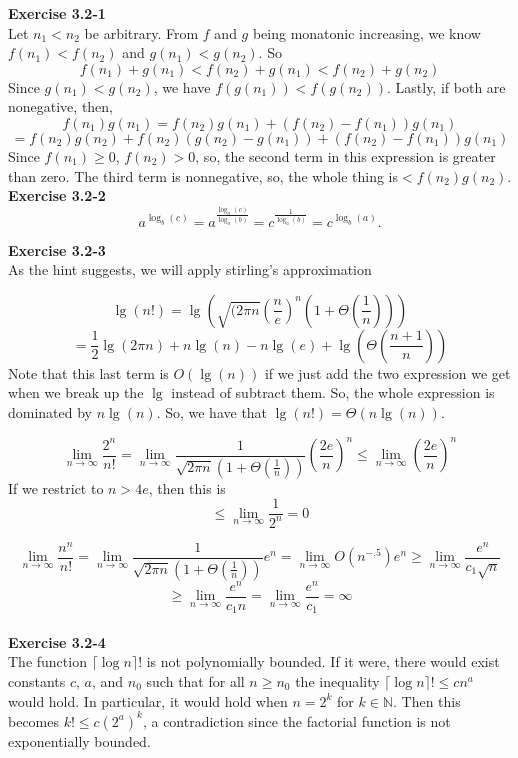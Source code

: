 \documentclass{article}
\begin{document}
\noindent\textbf{Exercise 3.2-1}\\

Let $n_1 < n_2$ be arbitrary. From $f$ and $g$ being monatonic increasing, we know $f(n_1)< f(n_2)$ and $g(n_1) < g(n_2)$. So
\[
f(n_1)+g(n_1) < f(n_2) + g(n_1) < f(n_2)+g(n_2)
\]
Since $g(n_1)<g(n_2)$, we have $f(g(n_1))<f(g(n_2))$. Lastly, if both are nonegative, then, 
\[
f(n_1)g(n_1) = f(n_2)g(n_1) + (f(n_2)-f(n_1))g(n_1) \]\[= f(n_2)g(n_2) + f(n_2)(g(n_2)-g(n_1)) +(f(n_2)-f(n_1))g(n_1) 
\]
Since $f(n_1)\ge 0$, $f(n_2)>0$, so, the second term in this expression is greater than zero. The third term is nonnegative, so, the whole thing is$<f(n_2)g(n_2)$.\\

\noindent\textbf{Exercise 3.2-2}\\

\[ a^{\log_b(c)} = a^{\frac{\log_a(c)}{\log_a(b)}} = c^{\frac{1}{\log_a(b)}} = c^{\log_b(a)}.\]

\noindent\textbf{Exercise 3.2-3}\\

As the hint suggests, we will apply stirling's approximation

\[
\lg(n!) = \lg\left(\sqrt{(2\pi n}\left(\frac{n}{e}\right)^n\left( 1 + \Theta\left(\frac{1}{n}\right)\right)\right) \]\[= \frac{1}{2}\lg(2\pi n) + n\lg(n) - n \lg (e) + \lg\left(\Theta\left(\frac{n+1}{n}\right)\right)
\]
Note that this last term is $O(\lg(n))$ if we just add the two expression we get when we break up the $\lg$ instead of subtract them. So, the whole expression is dominated by $n\lg(n)$. So, we have that $\lg(n!) = \Theta(n\lg(n))$.

\[
\lim_{n\rightarrow\infty} \frac{2^n}{n!} = \lim_{n\rightarrow\infty} \frac{1}{\sqrt{2\pi n}(1+\Theta(\frac{1}{n}))} \left(\frac{2e}{n}\right)^n \le  \lim_{n\rightarrow\infty} \left(\frac{2e}{n}\right)^n
\]
If we restrict to $n> 4e$, then this is 
\[
\le \lim_{n\rightarrow\infty} \frac{1}{2^n} = 0
\]

\[
\lim_{n\rightarrow\infty} \frac{n^n}{n!} = \lim_{n\rightarrow\infty} \frac{1}{\sqrt{2\pi n}(1+\Theta(\frac{1}{n}))}e^n =  \lim_{n\rightarrow\infty} O(n^{-.5})e^n \ge \lim_{n\rightarrow\infty} \frac{e^n}{c_1\sqrt{n}}\]\[ \ge\lim_{n\rightarrow\infty} \frac{e^n}{c_1n} =  \lim_{n\rightarrow\infty} \frac{e^n}{c_1} = \infty
\]\\

\noindent\textbf{Exercise 3.2-4}\\

The function $\lceil \log n \rceil !$ is not polynomially bounded.  If it were, there would exist constants $c$, $a$, and $n_0$ such that for all $n \geq n_0$ the inequality $\lceil \log n \rceil ! \leq cn^a$ would hold.  In particular, it would hold when $n=2^k$ for $k \in \mathbb{N}$.  Then this becomes $k! \leq c(2^a)^k$, a contradiction since the factorial function is not exponentially bounded.
\end{document}
